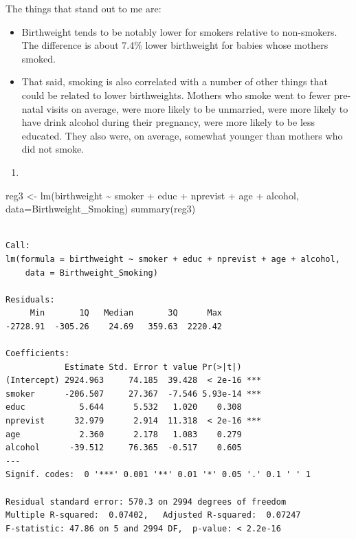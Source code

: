 \documentclass[
  letterpaper,
  DIV=11,
  numbers=noendperiod]{scrreprt}
\newenvironment{Shaded}{\begin{snugshade}}{\end{snugshade}}
\newcommand{\AttributeTok}[1]{\textcolor[rgb]{0.40,0.45,0.13}{#1}}
\newcommand{\FunctionTok}[1]{\textcolor[rgb]{0.28,0.35,0.67}{#1}}
\newcommand{\NormalTok}[1]{\textcolor[rgb]{0.00,0.23,0.31}{#1}}
\newcommand{\OtherTok}[1]{\textcolor[rgb]{0.00,0.23,0.31}{#1}}
\newcommand{\SpecialCharTok}[1]{\textcolor[rgb]{0.37,0.37,0.37}{#1}}
\providecommand{\tightlist}{%
  \setlength{\itemsep}{0pt}\setlength{\parskip}{0pt}}\usepackage{longtable,booktabs,array}
\begin{document}
The things that stand out to me are:

\begin{itemize}
\item
  Birthweight tends to be notably lower for smokers relative to
  non-smokers. The difference is about 7.4\% lower birthweight for
  babies whose mothers smoked.
\item
  That said, smoking is also correlated with a number of other things
  that could be related to lower birthweights. Mothers who smoke went to
  fewer pre-natal visits on average, were more likely to be unmarried,
  were more likely to have drink alcohol during their pregnancy, were
  more likely to be less educated. They also were, on average, somewhat
  younger than mothers who did not smoke.
\end{itemize}

\begin{enumerate}
\def\labelenumi{\arabic{enumi}.}
\setcounter{enumi}{2}
\tightlist
\item
\end{enumerate}

\begin{Shaded}
\begin{Highlighting}[]
\NormalTok{reg3 }\OtherTok{\textless{}{-}} \FunctionTok{lm}\NormalTok{(birthweight }\SpecialCharTok{\textasciitilde{}}\NormalTok{ smoker }\SpecialCharTok{+}\NormalTok{ educ }\SpecialCharTok{+}\NormalTok{ nprevist }\SpecialCharTok{+}\NormalTok{ age }\SpecialCharTok{+}\NormalTok{ alcohol,}
           \AttributeTok{data=}\NormalTok{Birthweight\_Smoking)}
\FunctionTok{summary}\NormalTok{(reg3)}
\end{Highlighting}
\end{Shaded}

\begin{verbatim}

Call:
lm(formula = birthweight ~ smoker + educ + nprevist + age + alcohol, 
    data = Birthweight_Smoking)

Residuals:
     Min       1Q   Median       3Q      Max 
-2728.91  -305.26    24.69   359.63  2220.42 

Coefficients:
            Estimate Std. Error t value Pr(>|t|)    
(Intercept) 2924.963     74.185  39.428  < 2e-16 ***
smoker      -206.507     27.367  -7.546 5.93e-14 ***
educ           5.644      5.532   1.020    0.308    
nprevist      32.979      2.914  11.318  < 2e-16 ***
age            2.360      2.178   1.083    0.279    
alcohol      -39.512     76.365  -0.517    0.605    
---
Signif. codes:  0 '***' 0.001 '**' 0.01 '*' 0.05 '.' 0.1 ' ' 1

Residual standard error: 570.3 on 2994 degrees of freedom
Multiple R-squared:  0.07402,   Adjusted R-squared:  0.07247 
F-statistic: 47.86 on 5 and 2994 DF,  p-value: < 2.2e-16
\end{verbatim}
\end{document}
